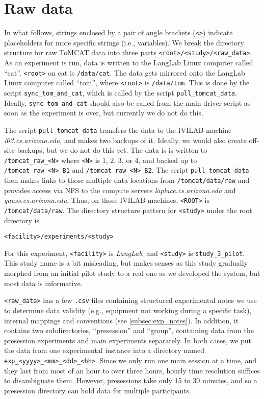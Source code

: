 \section{Raw data}

In what follows, strings enclosed by a pair of angle brackets (\verb|<>|) indicate
placeholders for more specific strings (i.e., variables).
We break the directory structure for raw ToMCAT data into three parts
\verb|<root>/<study>/<raw_data>|.
As an experiment is run, data is written to the LangLab Linux computer called
``cat''. \verb|<root>| on cat is
\verb|/data/cat|. The data gets mirrored onto the LangLab Linux computer called
``tom'', where \verb|<root>| is \verb|/data/tom|.
This is done by the script \verb|sync_tom_and_cat|, which is called by the script
\verb|pull_tomcat_data|. Ideally, \verb|sync_tom_and_cat| should also be
called from the main driver script as soon as the experiment is over, but
currently we do not do this.

The script \verb|pull_tomcat_data| transfers the data to the IVILAB machine
\textit{i03.cs.arizona.edu}, and makes two backups of it.  Ideally, we would
also create off-site backups, but we do not do this yet. The data is is
written to
\verb|/tomcat_raw_<N>| where \verb|<N>| is 1, 2, 3, or 4, and backed up to
\verb|/tomcat_raw_<N>_B1| and \verb|/tomcat_raw_<N>_B2|.
The script \verb|pull_tomcat_data| then makes links to those multiple data
locations from \verb|/tomcat/data/raw| and provides access via NFS to the compute
servers \textit{laplace.cs.arizona.edu} and \textit{gauss.cs.arizona.edu}.
Thus, on those IVILAB machines, \verb|<ROOT>| is \verb|/tomcat/data/raw|.
The directory structure pattern for \verb|<study>| under the root directory is

\begin{verbatim}
<facility>/experiments/<study>
\end{verbatim}

For this experiment, \verb|<facility>| is \textit{LangLab}, and \verb|<study>|
is \verb|study_3_pilot|.  This study name is a bit misleading, but makes senses
as this study gradually morphed from an initial pilot study to a real one as we
developed the system, but most data is informative.

\verb|<raw_data>| has a few \verb|.csv| files containing structured experimental notes we use to determine data validity (e.g., equipment not working during a specific task), internal mappings and conventions (see \autoref{subsec:exp_notes}). In addition, it contains two subdirectories, ``presession'' and ``group'', containing data
from the presession experiments and main experiments separately. In both cases, we put the
data from one experimental instance into a directory named
\verb|exp_<yyyy>_<mm>_<dd>_<hh>|. Since we only run one main session at a time, and
they last from most of an hour to over three hours, hourly time resolution
suffices to disambiguate them. However, presessions take only 15 to 30 minutes,
and so a presession directory can hold data for multiple participants.

